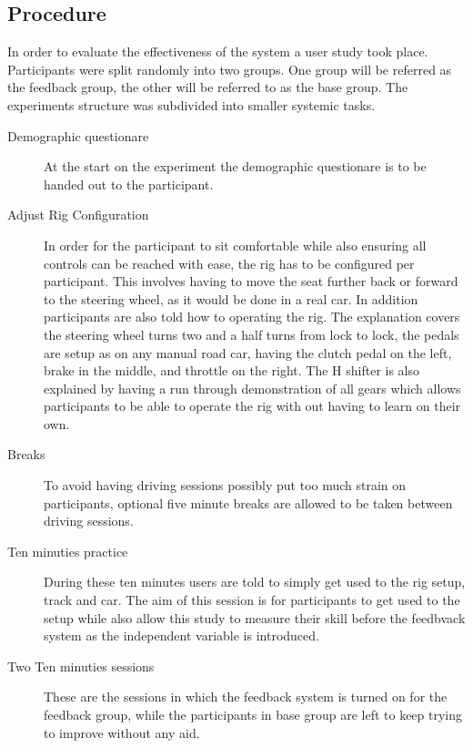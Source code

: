 \subsection{Procedure}
\label{sec:meth-experiment-structure}
In order to evaluate the effectiveness of the system a user study took place. Participants were split randomly into two groups. One group will be referred as the feedback group, the other will be referred to as the base group. The experiments structure was subdivided into smaller systemic tasks.

\begin{description}
	\item[Demographic questionare] At the start on the experiment the demographic questionare is to be handed out to the participant.
	
	\item[Adjust Rig Configuration] In order for the participant to sit comfortable while also ensuring all controls can be reached with ease, the rig has to be configured per participant. This involves having to move the seat further back or forward to the steering wheel, as it would be done in a real car. In addition participants are also told how to operating the rig. The explanation covers the steering wheel turns two and a half turns from lock to lock, the pedals are setup as on any manual road car, having the clutch pedal on the left, brake in the middle, and throttle on the right. The H shifter is also explained by having a run through demonstration of all gears which allows participants to be able to operate the rig with out having to learn on their own.
	
	\item[Breaks] To avoid having driving sessions possibly put too much strain on participants, optional five minute breaks are allowed to be taken between driving sessions. 
	
	\item[Ten minuties practice] During these ten minutes users are told to simply get used to the rig setup, track and car. The aim of this session is for participants to get used to the setup while also allow this study to measure their skill before the feedbvack system as the independent variable is introduced.
	
	\item[Two Ten minuties sessions] These are the sessions in which the feedback system is turned on for the feedback group, while the participants in base group are left to keep trying to improve without any aid. 
	

\end{description}
